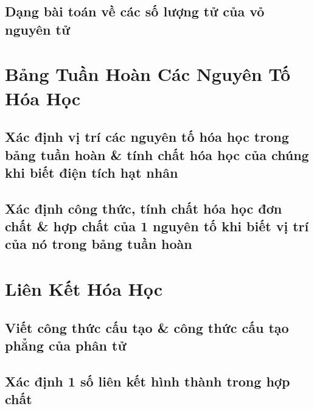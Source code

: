 \documentclass{article}
\numberwithin{equation}{section}
\begin{document}

\subsection{Dạng bài toán về các số lượng tử của vỏ nguyên tử}


\section{Bảng Tuần Hoàn Các Nguyên Tố Hóa Học}

\subsection{Xác định vị trí các nguyên tố hóa học trong bảng tuần hoàn \& tính chất hóa học của chúng khi biết điện tích hạt nhân}


\subsection{Xác định công thức, tính chất hóa học đơn chất \& hợp chất của 1 nguyên tố khi biết vị trí của nó trong bảng tuần hoàn}


\section{Liên Kết Hóa Học}

\subsection{Viết công thức cấu tạo \& công thức cấu tạo phẳng của phân tử}


\subsection{Xác định 1 số liên kết hình thành trong hợp chất}

\end{document}
